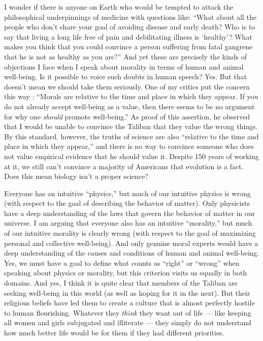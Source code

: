 \documentclass[a4paper,14pt]{extarticle}
\begin{document}
I wonder if there is anyone on Earth who would be tempted to attack the philosophical underpinnings of medicine with questions like: ``What about all the people who don't share your goal of avoiding disease and early death?
Who is to say that living a long life free of pain and debilitating illness is `healthy'?
What makes you think that you could convince a person suffering from fatal gangrene that he is not as healthy as you are?''
And yet these are precisely the kinds of objections I face when I speak about morality in terms of human and animal well-being.
Is it possible to voice such doubts in human speech?
Yes.
But that doesn't mean we should take them seriously.
One of my critics put the concern this way :
``Morals are relative to the time and place in which they appear.
If you do not already accept well-being as a value, then there seems to be no argument for why one \textit{should} promote well-being.''
As proof of this assertion, he observed that I would be unable to convince the Taliban that they value the wrong things.
By this standard, however, the truths of science are also ``relative to the time and place in which they appear,'' and there is no way to convince someone who does not value empirical evidence that he should value it.
Despite 150 years of working at it, we still can't convince a majority of Americans that evolution is a fact.
Does this mean biology isn't a proper science?

Everyone has an intuitive ``physics,'' but much of our intuitive physics is wrong (with respect to the goal of describing the behavior of matter).
Only physicists have a deep understanding of the laws that govern the behavior of matter in our universe.
I am arguing that everyone also has an intuitive ``morality,'' but much of our intuitive morality is clearly wrong (with respect to the goal of maximizing personal and collective well-being).
And only genuine moral experts would have a deep understanding of the causes and conditions of human and animal well-being.
Yes, we must have a goal to define what counts as ``right'' or ``wrong'' when speaking about physics or morality, but this criterion visits us equally in both domains.
And yes, I think it is quite clear that members of the Taliban are seeking well-being in this world (as well as hoping for it in the next).
But their religious beliefs have led them to create a culture that is almost perfectly hostile to human flourishing.
Whatever they \textit{think} they want out of life --- like keeping all women and girls subjugated and illiterate --- they simply do not understand how much better life would be for them if they had different priorities.
\end{document}
